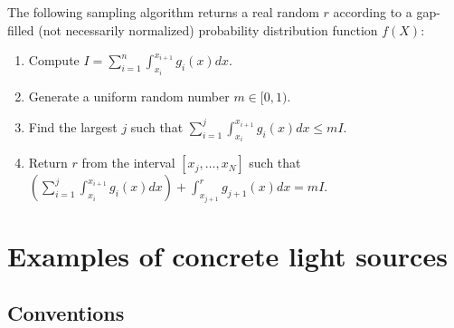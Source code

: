 \documentclass[12pt, letterpaper]{article}
\begin{document}
The following sampling algorithm returns a real random $r$ according to a gap-filled (not necessarily normalized) probability distribution function $f(X)$:
\begin{enumerate}
\item Compute $I = \sum_{i=1}^n {\int_{x_i}^{x_{i+1}} {g_i(x) dx}}$.
\item Generate a uniform random number $m\in [0, 1)$.
\item Find the largest $j$ such that $\sum_{i=1}^j {\int_{x_i}^{x_{i+1}} g_i(x) dx} \le mI$.
\item Return $r$ from the interval $[x_j, \dots, x_N]$ such that\\ $(\sum_{i=1}^j {\int_{x_i}^{x_{i+1}} g_i(x) dx}) + \int_{x_{j+1}}^r g_{j+1}(x) dx = mI$.
\end{enumerate}




\section{Examples of concrete light sources}

\subsection{Conventions}
\end{document}
